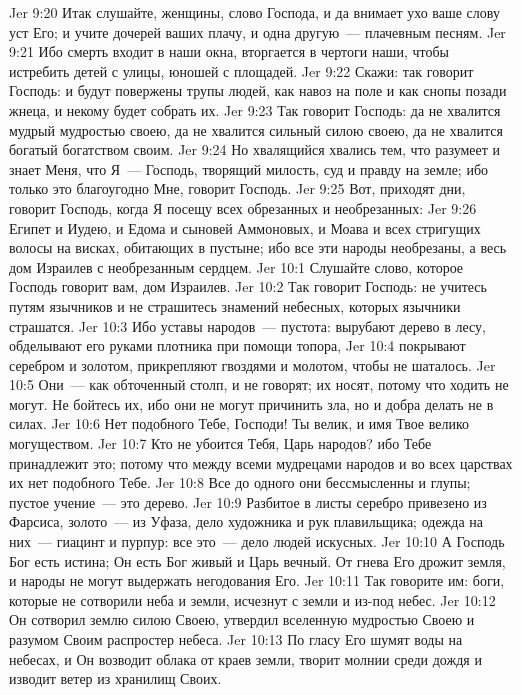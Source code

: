 \vs Jer 9:20 Итак слушайте, женщины, слово Господа, и да внимает ухо ваше слову уст Его; и учите дочерей ваших плачу, и одна другую~--- плачевным песням.
\vs Jer 9:21 Ибо смерть входит в наши окна, вторгается в чертоги наши, чтобы истребить детей с улицы, юношей с площадей.
\vs Jer 9:22 Скажи: так говорит Господь: и будут повержены трупы людей, как навоз на поле и как снопы позади жнеца, и некому будет собрать их.
\rsbpar\vs Jer 9:23 Так говорит Господь: да не хвалится мудрый мудростью своею, да не хвалится сильный силою своею, да не хвалится богатый богатством своим.
\vs Jer 9:24 Но хвалящийся хвались тем, что разумеет и знает Меня, что Я~--- Господь, творящий милость, суд и правду на земле; ибо только это благоугодно Мне, говорит Господь.
\vs Jer 9:25 Вот, приходят дни, говорит Господь, когда Я посещу всех обрезанных и необрезанных:
\vs Jer 9:26 Египет и Иудею, и Едома и сыновей Аммоновых, и Моава и всех стригущих волосы на висках, обитающих в пустыне; ибо все эти народы необрезаны, а весь дом Израилев с необрезанным сердцем.
\vs Jer 10:1 Слушайте слово, которое Господь говорит вам, дом Израилев.
\vs Jer 10:2 Так говорит Господь: не учитесь путям язычников и не страшитесь знамений небесных, которых язычники страшатся.
\vs Jer 10:3 Ибо уставы народов~--- пустота: вырубают дерево в лесу, обделывают его руками плотника при помощи топора,
\vs Jer 10:4 покрывают серебром и золотом, прикрепляют гвоздями и молотом, чтобы не шаталось.
\vs Jer 10:5 Они~--- как обточенный столп, и не говорят; их носят, потому что ходить не могут. Не бойтесь их, ибо они не могут причинить зла, но и добра делать не в силах.
\vs Jer 10:6 Нет подобного Тебе, Господи! Ты велик, и имя Твое велико могуществом.
\vs Jer 10:7 Кто не убоится Тебя, Царь народов? ибо Тебе  принадлежит это; потому что между всеми мудрецами народов и во всех царствах их нет подобного Тебе.
\vs Jer 10:8 Все до одного они бессмысленны и глупы; пустое учение~--- это дерево.
\vs Jer 10:9 Разбитое в листы серебро привезено из Фарсиса, золото~--- из Уфаза, дело художника и рук плавильщика; одежда на них~--- гиацинт и пурпур: все это~--- дело людей искусных.
\vs Jer 10:10 А Господь Бог есть истина; Он есть Бог живый и Царь вечный. От гнева Его дрожит земля, и народы не могут выдержать негодования Его.
\vs Jer 10:11 Так говорите им: боги, которые не сотворили неба и земли, исчезнут с земли и из-под небес.
\vs Jer 10:12 Он сотворил землю силою Своею, утвердил вселенную мудростью Своею и разумом Своим распростер небеса.
\vs Jer 10:13 По гласу Его шумят воды на небесах, и Он возводит облака от краев земли, творит молнии среди дождя и изводит ветер из хранилищ Своих.
